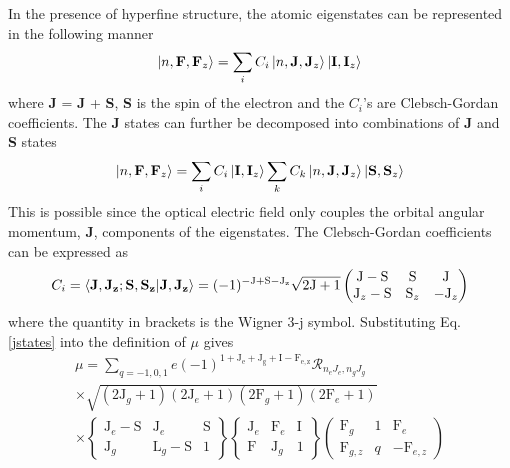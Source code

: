 In the presence of hyperfine structure, the atomic eigenstates can be represented in the following manner
\begin{equation}
\ket{n,\mathrm{\bf{F}},\mathrm{\bf{F}}_z} = \sum_iC_i\ket{n,\mathrm{\bf{J}},\mathrm{\bf{J}}_z}\ket{\mathrm{\bf{I}},\mathrm{\bf{I}}_z}
\label{jstates}
\end{equation}
where \textbf{J}  =\textbf{ J} + \textbf{S}, \textbf{S} is the spin of the electron and the $C_i$'s are Clebsch-Gordan coefficients. The \textbf{J} states can further be decomposed into combinations of \textbf{J} and \textbf{S} states
\begin{equation}
\ket{n,\mathrm{\bf{F}},\mathrm{\bf{F}}_z} = \sum_iC_i\ket{\mathrm{\bf{I}},\mathrm{\bf{I}}_z}\sum_kC_k\ket{n,\mathrm{\bf{J}},\mathrm{\bf{J}}_z}\ket{\mathrm{\bf{S}},\mathrm{\bf{S}}_z}
\label{jstates}
\end{equation}
This is possible since the optical electric field only couples the orbital angular momentum, \textbf{J}, components of the eigenstates. The Clebsch-Gordan coefficients can be expressed as
\begin{equation}
C_i = \braket{\mathrm{\bf{J},\bf{J}_z ; \bf{S},\bf{S}_z}|\mathrm{\bf{J},\bf{J}_z}}=(-1)^{\mathrm{-J+S-J_z}}\sqrt{\mathrm{2J+1}}
\left(
\begin{matrix}
\mathrm{J}-\mathrm{S} & \mathrm{S} & \mathrm{J}\\
\mathrm{J}_z-\mathrm{S} & \mathrm{S}_z & -\mathrm{J}_z
\end{matrix}
\right)
\end{equation}
where the quantity in brackets is the Wigner 3-j symbol. Substituting Eq. \ref{jstates} into the definition of $\mu$ gives 
\begin{equation}
\begin{split}
\mu = \sum_{q = -1,0,1} e (-1)^{\mathrm{1+J_e+J_g+I-F_{e,z}}}\mathcal{R}_{n_e J_e, n_g J_g}\\
\times \sqrt{(2\mathrm{J}_g+1)(2\mathrm{J}_e+1)(2\mathrm{F}_g+1)(2\mathrm{F}_e+1)}\\
\times \left\lbrace
\begin{matrix}
\mathrm{J}_e-\mathrm{S} & \mathrm{J}_e & \mathrm{S}\\
\mathrm{J}_g & \mathrm{L}_g-\mathrm{S} & 1
\end{matrix}
\right\rbrace
\left\lbrace
\begin{matrix}
\mathrm{J}_e & \mathrm{F}_e & \mathrm{I}\\
\mathrm{F} & \mathrm{J}_g &1
\end{matrix}
\right\rbrace
\left(
\begin{matrix}
\mathrm{F}_g & 1 & \mathrm{F}_e\\
\mathrm{F}_{g,z} & q &-\mathrm{F}_{e,z}
\end{matrix}
\right)
\end{split}
\end{equation}
